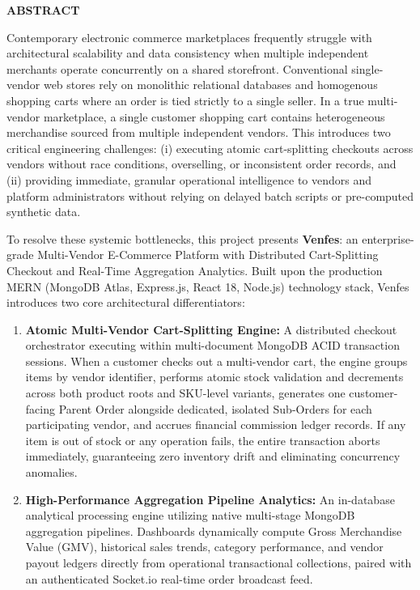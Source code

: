 \documentclass[12pt,a4paper]{report}
\begin{document}
\newpage
\begin{center}
    {\fontsize{16pt}{20pt}\selectfont \textbf{ABSTRACT}\par}
\end{center}
\vspace{0.6cm}

\noindent Contemporary electronic commerce marketplaces frequently struggle with architectural scalability and data consistency when multiple independent merchants operate concurrently on a shared storefront. Conventional single-vendor web stores rely on monolithic relational databases and homogenous shopping carts where an order is tied strictly to a single seller. In a true multi-vendor marketplace, a single customer shopping cart contains heterogeneous merchandise sourced from multiple independent vendors. This introduces two critical engineering challenges: (i) executing atomic cart-splitting checkouts across vendors without race conditions, overselling, or inconsistent order records, and (ii) providing immediate, granular operational intelligence to vendors and platform administrators without relying on delayed batch scripts or pre-computed synthetic data.

To resolve these systemic bottlenecks, this project presents \textbf{Venfes}: an enterprise-grade Multi-Vendor E-Commerce Platform with Distributed Cart-Splitting Checkout and Real-Time Aggregation Analytics. Built upon the production MERN (MongoDB Atlas, Express.js, React 18, Node.js) technology stack, Venfes introduces two core architectural differentiators:
\begin{enumerate}[label=(\roman*)]
    \item \textbf{Atomic Multi-Vendor Cart-Splitting Engine:} A distributed checkout orchestrator executing within multi-document MongoDB ACID transaction sessions. When a customer checks out a multi-vendor cart, the engine groups items by vendor identifier, performs atomic stock validation and decrements across both product roots and SKU-level variants, generates one customer-facing Parent Order alongside dedicated, isolated Sub-Orders for each participating vendor, and accrues financial commission ledger records. If any item is out of stock or any operation fails, the entire transaction aborts immediately, guaranteeing zero inventory drift and eliminating concurrency anomalies.
    \item \textbf{High-Performance Aggregation Pipeline Analytics:} An in-database analytical processing engine utilizing native multi-stage MongoDB aggregation pipelines. Dashboards dynamically compute Gross Merchandise Value (GMV), historical sales trends, category performance, and vendor payout ledgers directly from operational transactional collections, paired with an authenticated Socket.io real-time order broadcast feed.
\end{enumerate}
\end{document}

